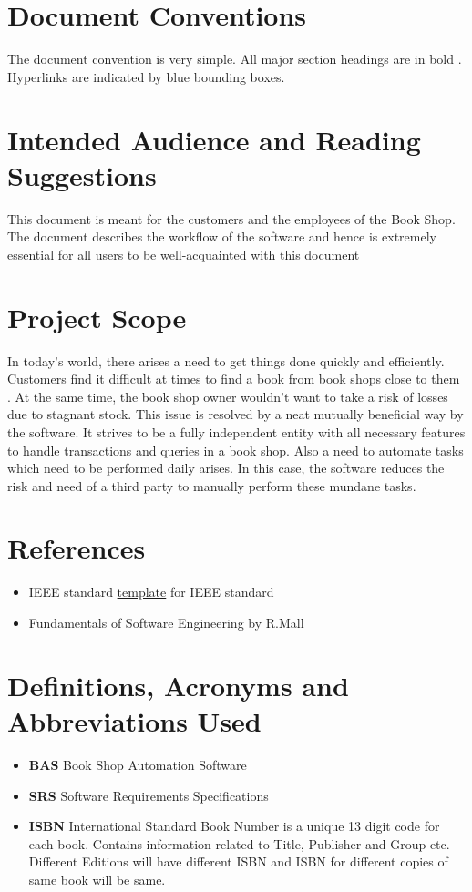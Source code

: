 \documentclass{scrreprt}
\begin{document}
\section{Document Conventions}
The document convention is very simple. All major section headings are in bold . Hyperlinks are indicated by blue bounding boxes.

\section{Intended Audience and Reading Suggestions}
This document is meant for the customers and the employees of the Book Shop. The document describes the workflow of the software and hence is extremely essential for all users to be well-acquainted with this document

\section{Project Scope}
In today's world, there arises a need to get things done quickly and efficiently. Customers find it difficult at times to find a book from book shops close to them . At the same time, the book shop owner wouldn't want to take a risk of losses due to stagnant stock. This issue is resolved by a neat mutually beneficial way by the software. It strives to be a fully independent entity with all necessary features to handle transactions and queries in a book shop. 
Also a need to automate tasks which need to be performed daily arises. In this case, the software reduces the risk and need of a third party to manually perform these mundane tasks.

\section{References}

\begin{itemize}
\item IEEE standard \href{http://www.cse.msu.edu/~cse870/IEEEXplore-SRS-template.pdf}{template} for IEEE standard 

\item Fundamentals of Software Engineering by R.Mall
\end{itemize}

\section{Definitions, Acronyms and Abbreviations Used}
\begin{itemize}
\item \textbf{BAS}   Book Shop Automation Software
\item \textbf{SRS}   Software Requirements Specifications
\item \textbf{ISBN}   International Standard Book Number is a unique 13 digit code for each book. Contains  information related to Title, Publisher and Group etc. Different Editions will have different ISBN and  ISBN for different copies of same book will be same.

\end{itemize}
\end{document}
